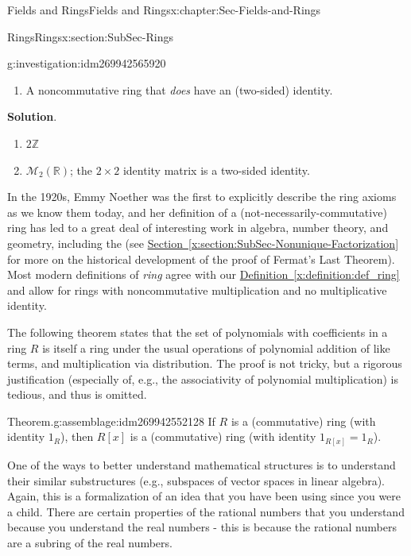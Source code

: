 \documentclass[oneside,10pt,]{book}
\numberwithin{equation}{section}
\def\Z{{\mathbb Z}}
\def\R{{\mathbb R}}
\begin{document}
\begin{chapterptx}{Fields and Rings}{}{Fields and Rings}{}{}{x:chapter:Sec-Fields-and-Rings}
\begin{sectionptx}{Rings}{}{Rings}{}{}{x:section:SubSec-Rings}
\begin{investigation}{}{g:investigation:idm269942565920}
\begin{enumerate}
\item{}A noncommutative ring that \emph{does} have an (two-sided) identity.%
\end{enumerate}
%
\par\smallskip%
\noindent\textbf{Solution}.\hypertarget{g:solution:idm269942560288}{}\quad{}%
\begin{enumerate}
\item{}\(2\Z\)%
\item{}\(\mathcal{M}_2(\R)\); the \(2\times 2\) identity matrix is a two-sided identity.%
\end{enumerate}
%
\end{investigation}
%
In the 1920s, Emmy Noether was the first to explicitly describe the ring axioms as we know them today, and her definition of a (not-necessarily-commutative) ring has led to a great deal of interesting work in algebra, number theory, and geometry, including the (see \hyperref[x:section:SubSec-Nonunique-Factorization]{Section~\ref{x:section:SubSec-Nonunique-Factorization}} for more on the historical development of the proof of Fermat's Last Theorem). Most modern definitions of \emph{ring} agree with our \hyperref[x:definition:def_ring]{Definition~\ref{x:definition:def_ring}} and allow for rings with noncommutative multiplication and no multiplicative identity.%
\par
The following theorem states that the set of polynomials with coefficients in a ring \(R\) is itself a ring under the usual operations of polynomial addition of like terms, and multiplication via distribution. The proof is not tricky, but a rigorous justification (especially of, e.g., the associativity of polynomial multiplication) is tedious, and thus is omitted.%
\begin{assemblage}{Theorem.}{g:assemblage:idm269942552128}%
If \(R\) is a (commutative) ring (with identity \(1_R\)), then \(R[x]\) is a (commutative) ring (with identity \(1_{R[x]} = 1_R\)).%
\end{assemblage}
One of the ways to better understand mathematical structures is to understand their similar substructures (e.g., subspaces of vector spaces in linear algebra). Again, this is a formalization of an idea that you have been using since you were a child. There are certain properties of the rational numbers that you understand because you understand the real numbers - this is because the rational numbers are a subring of the real numbers.%

\end{sectionptx}
\end{chapterptx}
\end{document}
